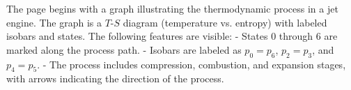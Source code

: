 The page begins with a graph illustrating the thermodynamic process in a jet engine. The graph is a \( T \)-\( S \) diagram (temperature vs. entropy) with labeled isobars and states. The following features are visible:  
- States 0 through 6 are marked along the process path.  
- Isobars are labeled as \( p_0 = p_6 \), \( p_2 = p_3 \), and \( p_4 = p_5 \).  
- The process includes compression, combustion, and expansion stages, with arrows indicating the direction of the process.